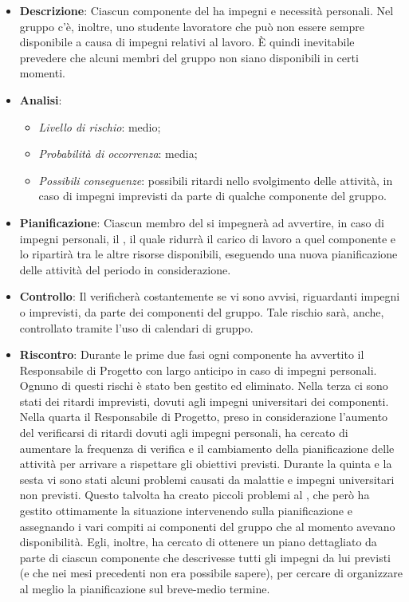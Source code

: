 			\begin{itemize}
				\item \textbf{Descrizione}: Ciascun componente del  ha impegni e necessità personali. Nel gruppo c'è, inoltre, uno studente lavoratore che può non essere sempre disponibile a causa di impegni relativi al lavoro. È quindi inevitabile prevedere che alcuni membri del gruppo non siano disponibili in certi momenti.
				\item \textbf{Analisi}:
				\begin{itemize}
					\item \textit{Livello di rischio}: medio;
					\item \textit{Probabilità di occorrenza}: media;
					\item \textit{Possibili conseguenze}: possibili ritardi nello svolgimento delle attività, in caso di impegni imprevisti da parte di qualche componente del gruppo.
				\end{itemize}
				\item \textbf{Pianificazione}: Ciascun membro del  si impegnerà ad avvertire, in caso di impegni personali, il , il quale ridurrà il carico di lavoro a quel componente e lo ripartirà tra le altre risorse disponibili, eseguendo una nuova pianificazione delle attività del periodo in considerazione.
				\item \textbf{Controllo}: Il  verificherà costantemente se vi sono avvisi, riguardanti impegni o imprevisti, da parte dei componenti del gruppo. Tale rischio sarà, anche, controllato tramite l'uso di calendari di gruppo.
				\item \textbf{Riscontro}: Durante le prime due fasi ogni componente ha avvertito il Responsabile di Progetto con largo anticipo in caso di impegni personali. Ognuno di questi rischi è stato ben gestito ed eliminato. Nella terza  ci sono stati dei ritardi imprevisti, dovuti agli impegni universitari dei componenti. Nella quarta  il Responsabile di Progetto, preso in considerazione l’aumento del verificarsi di ritardi dovuti agli impegni personali, ha cercato di aumentare la frequenza di verifica e il cambiamento della pianificazione delle attività per arrivare a rispettare gli obiettivi previsti. Durante la quinta e la sesta  vi sono stati alcuni problemi causati da malattie e impegni universitari non previsti. Questo talvolta ha creato piccoli problemi al , che però ha gestito ottimamente la situazione intervenendo sulla pianificazione e assegnando i vari compiti ai componenti del gruppo che al momento avevano disponibilità. Egli, inoltre, ha cercato di ottenere un piano dettagliato da parte di ciascun componente che descrivesse tutti gli impegni da lui previsti (e che nei mesi precedenti non era possibile sapere), per cercare di organizzare al meglio la pianificazione sul breve-medio termine.
			\end{itemize}

